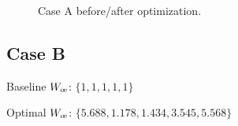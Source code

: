 \begin{figure}[H]
    \begin{animateinline}[controls,width=\linewidth, loop]{10}
    \end{animateinline}
    \caption{Case A before/after optimization.}
    \label{fig:benchmark_optim_anim}
\end{figure}

\newpage
\subsection{Case B}
\label{sec:gso_case_plot}
Baseline \(W_{\moe}\): \(\{1, 1, 1, 1, 1\}\)

Optimal \(W_{\moe}\): \(\{5.688, 1.178, 1.434, 3.545, 5.568\}\)


